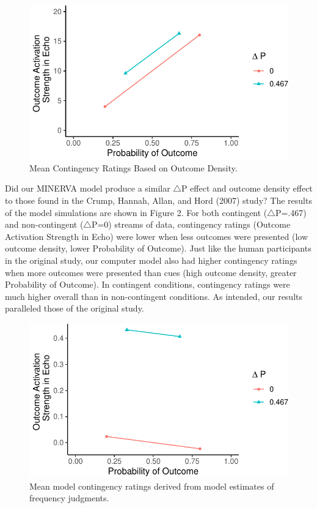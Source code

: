 \documentclass[
  english,
  man,floatsintext]{apa6}
\begin{document}
\begin{figure}

{\centering \includegraphics{thesis_files/figure-latex/unnamed-chunk-5-1} 

}

\caption{Mean Contingency Ratings Based on Outcome Density.}\label{fig:unnamed-chunk-5}
\end{figure}

Did our MINERVA model produce a similar \(\triangle\)P effect and outcome density effect to those found in the Crump, Hannah, Allan, and Hord (2007) study? The results of the model simulations are shown in Figure 2. For both contingent (\(\triangle\)P=.467) and non-contingent (\(\triangle\)P=0) streams of data, contingency ratings (Outcome Activation Strength in Echo) were lower when less outcomes were presented (low outcome density, lower Probability of Outcome). Just like the human participants in the original study, our computer model also had higher contingency ratings when more outcomes were presented than cues (high outcome density, greater Probability of Outcome). In contingent conditions, contingency ratings were much higher overall than in non-contingent conditions. As intended, our results paralleled those of the original study.

\begin{figure}

{\centering \includegraphics{thesis_files/figure-latex/unnamed-chunk-7-1} 

}

\caption{Mean model contingency ratings derived from model estimates of frequency judgments.}\label{fig:unnamed-chunk-7}
\end{figure}
\end{document}
